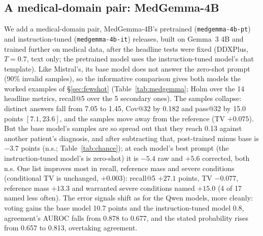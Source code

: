 \documentclass[11pt]{article}
\begin{document}
\subsection{A medical-domain pair: MedGemma-4B}\label{sec:medgemma}
We add a medical-domain pair, MedGemma-4B's pretrained (\texttt{medgemma-4b-pt}) and instruction-tuned (\texttt{medgemma-4b-it}) releases, built on Gemma~3 4B and trained further on medical data, after the headline tests were fixed (DDXPlus, $T{=}0.7$, text only; the pretrained model uses the instruction-tuned model's chat template). Like Mistral's, its base model does not answer the zero-shot prompt (90\% invalid samples), so the informative comparison gives both models the worked examples of \S\ref{sec:fewshot} (Table~\ref{tab:medgemma}; Holm over the 14 headline metrics, recall@5 over the 5 secondary ones). The samples collapse: distinct answers fall from 7.05 to 1.45, Cov@32 by 0.182 and pass@32 by 15.0 points $[7.1,23.6]$, and the samples move away from the reference (TV $+0.075$). But the base model's samples are so spread out that they reach 0.13 against another patient's diagnosis, and after subtracting that, post-trained minus base is $-3.7$ points (n.s.; Table~\ref{tab:chance}); at each model's best prompt (the instruction-tuned model's is zero-shot) it is $-5.4$ raw and $+5.6$ corrected, both n.s. One list improves most in recall, reference mass and severe conditions (conditional TV is unchanged, $+0.003$): recall@5 $+27.1$ points, TV $-0.077$, reference mass $+13.3$ and warranted severe conditions named $+15.0$ (4 of 17 named less often). The error signals shift as for the Qwen models, more cleanly: voting gains the base model 10.7 points and the instruction-tuned model 0.8, agreement's AUROC falls from 0.878 to 0.677, and the stated probability rises from 0.657 to 0.813, overtaking agreement.
\end{document}
